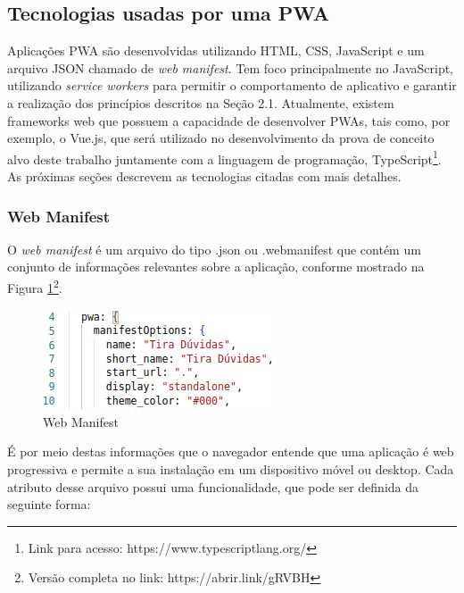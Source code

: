 \documentclass[12pt]{article}
\begin{document}
\subsection{Tecnologias usadas por uma PWA} \label{sec:tecnologias}

Aplicações PWA são desenvolvidas utilizando HTML, CSS, JavaScript e um arquivo JSON chamado de \textit{web manifest}. Tem foco principalmente no JavaScript, utilizando \textit{service workers} para permitir o comportamento de aplicativo e garantir a realização dos princípios descritos na Seção 2.1. Atualmente, existem  frameworks web que possuem a capacidade de desenvolver PWAs, tais como, por exemplo, o Vue.js, que será utilizado no desenvolvimento da prova de conceito alvo deste trabalho juntamente com a linguagem de programação, TypeScript\footnote{Link para acesso: https://www.typescriptlang.org/}. As próximas seções descrevem as tecnologias citadas com mais detalhes.

\subsubsection{Web Manifest} \label{sec:web_manifest}

O \textit{web manifest} é um arquivo do tipo .json ou .webmanifest que contém um conjunto de informações relevantes sobre a aplicação, conforme mostrado na Figura \ref{fig:web_manifest}\footnote{Versão completa no link: https://abrir.link/gRVBH}.

\begin{figure}[ht]
\centering
\includegraphics[width=.5\textwidth]{imagens/manifest.jpg}
\caption{Web Manifest}
\label{fig:web_manifest}
\end{figure}

É por meio destas informações que o navegador entende que uma aplicação é web progressiva e permite a sua instalação em um dispositivo móvel ou desktop. Cada atributo desse arquivo possui uma funcionalidade, que pode ser definida da seguinte forma:
\end{document}

